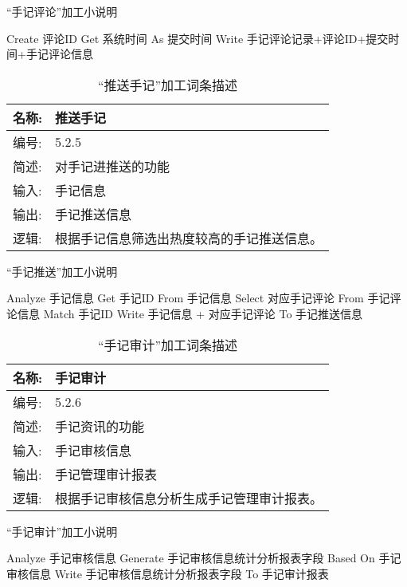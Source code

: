 \begin{algorithm}[H]
    \renewcommand{\thealgorithm}{}
    \caption{“手记评论”加工小说明} 
    \label{alg3} 
    \begin{algorithmic}[1]
        \STATE Create 评论ID
        \STATE Get 系统时间 As 提交时间
        \STATE Write 手记评论记录+评论ID+提交时间+手记评论信息
    \end{algorithmic} 
\end{algorithm}

\begin{table}[H]  
\caption{“推送手记”加工词条描述}  
\begin{center}  
    \begin{tabular}{l p{11cm}} 
        \hline
        \quad 名称:  &  推送手记 \\
        \hline
        \quad 编号:  & 5.2.5 \\
        \hline
        \quad 简述:  & 对手记进推送的功能 \\
        \hline
        \quad 输入:  & 手记信息 \\
        \hline
        \quad 输出:  & 手记推送信息 \\
        \hline
        \quad 逻辑:  & 根据手记信息筛选出热度较高的手记推送信息。 \\
        \hline
    \end{tabular}
    \label{tab1}
\end{center}
\end{table}

\begin{algorithm}[H]
    \renewcommand{\thealgorithm}{}
    \caption{“手记推送”加工小说明} 
    \label{alg3} 
    \begin{algorithmic}[1]
        \STATE Analyze 手记信息
        \STATE Get 手记ID From 手记信息
        \STATE Select 对应手记评论 From 手记评论信息 Match 手记ID
        \STATE Write 手记信息 + 对应手记评论 To 手记推送信息
    \end{algorithmic} 
\end{algorithm}

\begin{table}[H]  
\caption{“手记审计”加工词条描述}  
\begin{center}  
    \begin{tabular}{l p{11cm}} 
        \hline
        \quad 名称:  & 手记审计 \\
        \hline
        \quad 编号:  & 5.2.6 \\
        \hline
        \quad 简述:  & 手记资讯的功能 \\
        \hline
        \quad 输入:  & 手记审核信息 \\
        \hline
        \quad 输出:  & 手记管理审计报表 \\
        \hline
        \quad 逻辑:  & 根据手记审核信息分析生成手记管理审计报表。 \\
        \hline
    \end{tabular}
    \label{tab1}
\end{center}
\end{table}

\begin{algorithm}[H]
    \renewcommand{\thealgorithm}{}
    \caption{“手记审计”加工小说明} 
    \label{alg3} 
    \begin{algorithmic}[1]
        \STATE Analyze 手记审核信息
        \STATE Generate 手记审核信息统计分析报表字段 Based On 手记审核信息
        \STATE Write 手记审核信息统计分析报表字段 To 手记审计报表
    \end{algorithmic} 
\end{algorithm}
